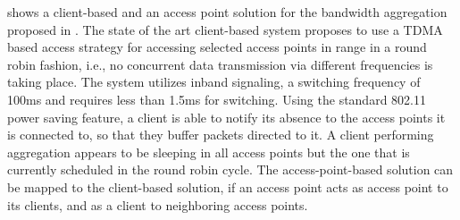 
 shows a client-based and an access point solution for the bandwidth aggregation proposed in \cite{goma2013patent}.
The state of the art client-based system proposes to use a TDMA based access strategy for accessing selected access points in range in a round robin fashion, i.e., no concurrent data transmission via different frequencies is taking place.
The system utilizes inband signaling, a switching frequency of 100ms and requires less than 1.5ms for switching.
Using the standard 802.11 power saving feature, a client is able to notify its absence to the access points it is connected to, so that they buffer packets directed to it.
A client performing aggregation appears to be sleeping in all access points but the one that is currently scheduled in the round robin cycle.
The access-point-based solution can be mapped to the client-based solution, if an access point acts as access point to its clients, and as a client to neighboring access points.

